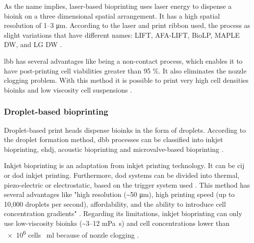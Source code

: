 As the name implies, laser-based bioprinting uses laser energy to dispense a bioink on a three dimensional spatial arrangement. It has a high spatial resolution of \numrange{1}{3} \si{\micro\meter}. According to the laser and print ribbon used, the process as slight variations that have different names: LIFT, AFA-LIFT, BioLP, MAPLE DW, and LG DW \cite{Vijayavenkataraman2018_bioprinting_tissues_organs_regen_med}.

\gls{lbb} has several advantages like being a non-contact process, which enables it to have post-printing cell viabilities greater than 95 \%. It also eliminates the nozzle clogging problem. With this method it is possible to print very high cell densities bioinks and low viscosity cell suspensions \cite{Vijayavenkataraman2018_bioprinting_tissues_organs_regen_med}.


\subsubsection{Droplet-based bioprinting}
\label{subsubsec:droplet_based_bioprinting}

Droplet-based print heads dispense bioinks in the form of droplets. According to the droplet formation method, \gls{dbb} processes can be classified into inkjet bioprinting, \gls{ehdj}, acoustic bioprinting and microvalve-based bioprinting \cite{Vijayavenkataraman2018_bioprinting_tissues_organs_regen_med}.

Inkjet bioprinting is an adaptation from inkjet printing technology. It can be \gls{cij} or \gls{dod} inkjet printing. Furthermore, \gls{dod} systems can be divided into thermal, piezo-electric or electrostatic, based on the trigger system used \cite{Vijayavenkataraman2018_bioprinting_tissues_organs_regen_med}. This method has several advantages like "high resolution (\textasciitilde 50 \si{\micro\meter}), high printing speed (up to 10,000 droplets per second), affordability, and the ability to introduce cell concentration gradients" \cite{Vijayavenkataraman2018_bioprinting_tissues_organs_regen_med}. Regarding its limitations, inkjet bioprinting can only use low-viscosity bioinks (\textasciitilde \numrange{3}{12} \si{\milli\pascal\second}) and cell concentrations lower than \num{e6} cells \si{\per\milli\litre} because of nozzle clogging \cite{Vijayavenkataraman2018_bioprinting_tissues_organs_regen_med}.

